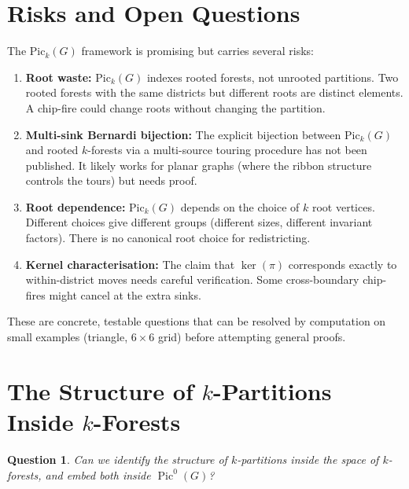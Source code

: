 \documentclass[11pt]{article}
\newcommand{\Pic}{\operatorname{Pic}^0}
\newtheorem{question}{Question}
\begin{document}
\section{Risks and Open Questions}

The $\mathrm{Pic}_k(G)$ framework is promising but carries several risks:

\begin{enumerate}
  \item \textbf{Root waste:} $\mathrm{Pic}_k(G)$ indexes rooted forests, not
    unrooted partitions. Two rooted forests with the same districts but
    different roots are distinct elements. A chip-fire could change roots
    without changing the partition.

  \item \textbf{Multi-sink Bernardi bijection:} The explicit bijection between
    $\mathrm{Pic}_k(G)$ and rooted $k$-forests via a multi-source touring
    procedure has not been published. It likely works for planar graphs (where
    the ribbon structure controls the tours) but needs proof.

  \item \textbf{Root dependence:} $\mathrm{Pic}_k(G)$ depends on the choice of
    $k$ root vertices. Different choices give different groups (different sizes,
    different invariant factors). There is no canonical root choice for
    redistricting.

  \item \textbf{Kernel characterisation:} The claim that $\ker(\pi)$
    corresponds exactly to within-district moves needs careful verification.
    Some cross-boundary chip-fires might cancel at the extra sinks.
\end{enumerate}

These are concrete, testable questions that can be resolved by computation on
small examples (triangle, $6 \times 6$ grid) before attempting general proofs.


\section{The Structure of $k$-Partitions Inside $k$-Forests}

\begin{question}
Can we identify the structure of $k$-partitions inside the space of
$k$-forests, and embed both inside $\Pic(G)$?
\end{question}
\end{document}
